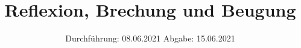

\subject{V400}
\title{Reflexion, Brechung und Beugung}
\date{%
  Durchführung: 08.06.2021
  \hspace{3em}
  Abgabe: 15.06.2021
}



\maketitle
\thispagestyle{empty}
\tableofcontents
\newpage





\nocite{*}
\printbibliography{}


